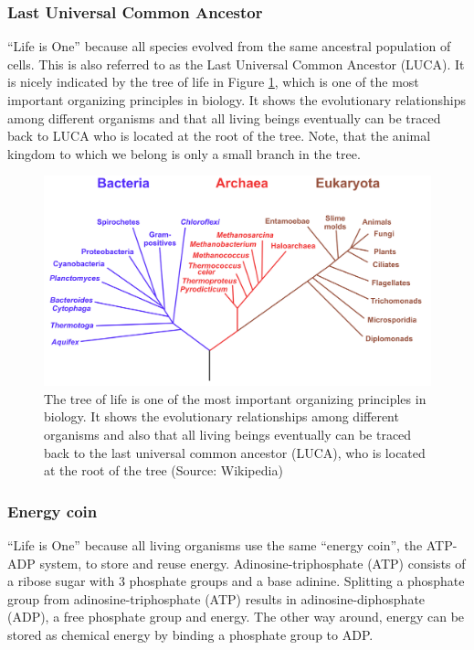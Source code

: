 \documentclass[
  11pt,
]{book}
\begin{document}
\hypertarget{last-universal-common-ancestor}{%
\subsubsection{Last Universal Common Ancestor}\label{last-universal-common-ancestor}}

``Life is One'' because all species evolved from the same ancestral population of cells.
This is also referred to as the Last Universal Common Ancestor (LUCA). It is nicely indicated by the tree of life in Figure \ref{fig:treeOfLife}, which is one of the most important organizing principles in biology. It shows the evolutionary relationships among different organisms and that all living beings eventually can be traced back to LUCA who is located at the root of the tree. Note, that the animal kingdom to which we belong is only a small branch in the tree.

\begin{figure}

{\centering \includegraphics[width=0.8\linewidth]{./figs/Phylogenetic_tree} 

}

\caption{The tree of life is one of the most important organizing principles in biology. It shows the evolutionary relationships among different organisms and also that all living beings eventually can be traced back to the last universal common ancestor (LUCA), who is located at the root of the tree (Source: Wikipedia)}\label{fig:treeOfLife}
\end{figure}

\newpage

\hypertarget{sectionEnergyCoin}{%
\subsubsection{Energy coin}\label{sectionEnergyCoin}}

``Life is One'' because all living organisms use the same ``energy coin'', the ATP-ADP system, to store and reuse energy.
Adinosine-triphosphate (ATP) consists of a ribose sugar with 3 phosphate groups and a base adinine.
Splitting a phosphate group from adinosine-triphosphate (ATP) results in adinosine-diphosphate (ADP), a free phosphate group and energy.
The other way around, energy can be stored as chemical energy by binding a phosphate group to ADP.
\end{document}
